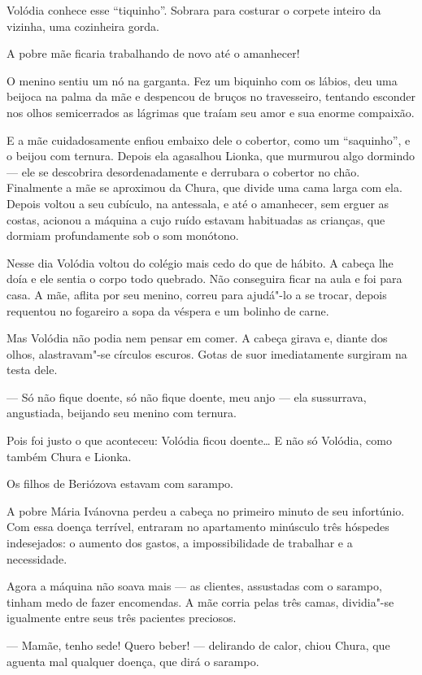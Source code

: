 Volódia conhece esse ``tiquinho''. Sobrara para costurar o corpete
inteiro da vizinha, uma cozinheira gorda.

A pobre mãe ficaria trabalhando de novo até o amanhecer!

O menino sentiu um nó na garganta. Fez um biquinho com os lábios, deu
uma beijoca na palma da mãe e despencou de bruços no travesseiro,
tentando esconder nos olhos semicerrados as lágrimas que traíam seu amor
e sua enorme compaixão.

E a mãe cuidadosamente enfiou embaixo dele o cobertor, como um
``saquinho'', e o beijou com ternura. Depois ela agasalhou Lionka, que
murmurou algo dormindo --- ele se descobrira desordenadamente e
derrubara o cobertor no chão. Finalmente a mãe se aproximou da Chura,
que divide uma cama larga com ela. Depois voltou a seu cubículo, na
antessala, e até o amanhecer, sem erguer as costas, acionou a máquina a
cujo ruído estavam habituadas as crianças, que dormiam profundamente sob
o som monótono.

\asterisc

Nesse dia Volódia voltou do colégio mais cedo do que de hábito. A cabeça
lhe doía e ele sentia o corpo todo quebrado. Não conseguira ficar na
aula e foi para casa. A mãe, aflita por seu menino, correu para ajudá"-lo
a se trocar, depois requentou no fogareiro a sopa da véspera e um
bolinho de carne.

Mas Volódia não podia nem pensar em comer. A cabeça girava e, diante dos
olhos, alastravam"-se círculos escuros. Gotas de suor imediatamente
surgiram na testa dele.

--- Só não fique doente, só não fique doente, meu anjo --- ela
sussurrava, angustiada, beijando seu menino com ternura.

Pois foi justo o que aconteceu: Volódia ficou doente\ldots{} E não só
Volódia, como também Chura e Lionka.

Os filhos de Beriózova estavam com sarampo.

A pobre Mária Ivánovna perdeu a cabeça no primeiro minuto de seu
infortúnio. Com essa doença terrível, entraram no apartamento minúsculo
três hóspedes indesejados: o aumento dos gastos, a impossibilidade de
trabalhar e a necessidade.

Agora a máquina não soava mais --- as clientes, assustadas com o
sarampo, tinham medo de fazer encomendas. A mãe corria pelas três camas,
dividia"-se igualmente entre seus três pacientes preciosos.

--- Mamãe, tenho sede! Quero beber! --- delirando de calor, chiou Chura,
que aguenta mal qualquer doença, que dirá o sarampo.

